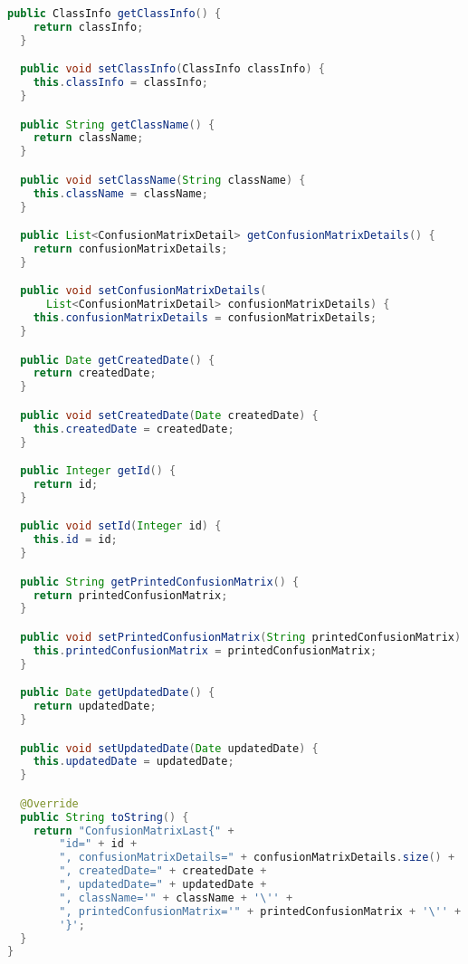 \begin{lstlisting}[language=Java,basicstyle=\tiny,caption=ConfusionMatrix.java]
  public ClassInfo getClassInfo() {
    return classInfo;
  }

  public void setClassInfo(ClassInfo classInfo) {
    this.classInfo = classInfo;
  }

  public String getClassName() {
    return className;
  }

  public void setClassName(String className) {
    this.className = className;
  }

  public List<ConfusionMatrixDetail> getConfusionMatrixDetails() {
    return confusionMatrixDetails;
  }

  public void setConfusionMatrixDetails(
      List<ConfusionMatrixDetail> confusionMatrixDetails) {
    this.confusionMatrixDetails = confusionMatrixDetails;
  }

  public Date getCreatedDate() {
    return createdDate;
  }

  public void setCreatedDate(Date createdDate) {
    this.createdDate = createdDate;
  }

  public Integer getId() {
    return id;
  }

  public void setId(Integer id) {
    this.id = id;
  }

  public String getPrintedConfusionMatrix() {
    return printedConfusionMatrix;
  }

  public void setPrintedConfusionMatrix(String printedConfusionMatrix) {
    this.printedConfusionMatrix = printedConfusionMatrix;
  }

  public Date getUpdatedDate() {
    return updatedDate;
  }

  public void setUpdatedDate(Date updatedDate) {
    this.updatedDate = updatedDate;
  }

  @Override
  public String toString() {
    return "ConfusionMatrixLast{" +
        "id=" + id +
        ", confusionMatrixDetails=" + confusionMatrixDetails.size() +
        ", createdDate=" + createdDate +
        ", updatedDate=" + updatedDate +
        ", className='" + className + '\'' +
        ", printedConfusionMatrix='" + printedConfusionMatrix + '\'' +
        '}';
  }
}

\end{lstlisting}


